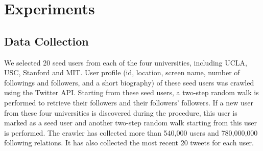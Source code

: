 \section{Experiments}\label{sec:experiment}




\subsection{Data Collection}
We selected 20 seed users from each of the four universities, including UCLA, USC, Stanford and MIT. User profile (id, location, screen name, number of followings and followers, and a short biography) of these seed users was crawled using the Twitter API. Starting from these seed users, a two-step random walk is performed to retrieve their followers and their followers' followers. If a new user from these four universities is discovered during the procedure, this user is marked as a seed user and another two-step random walk starting from this user is performed. The crawler has collected more than 540,000 users and 780,000,000 following relations. It has also collected the most recent 20 tweets for each user.

